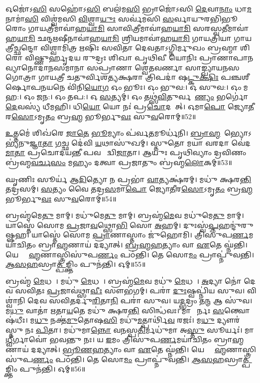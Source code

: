 𑌓𑌜𑍋॑𑌽\ul{𑌸𑌿} 𑌸𑌹𑍋॑𑌽\ul{𑌸𑌿} 𑌬𑌲॑𑌮\ul{𑌸𑌿} 𑌭𑍍𑌰𑌾𑌜𑍋॑𑌽𑌸𑌿 \ul{𑌦𑍇}𑌵𑌾\ul{𑌨𑌾𑌂} 𑌧𑌾\ul{𑌮} 𑌨𑌾𑌮𑌾॑\ul{𑌸𑌿} 𑌵𑌿𑌶𑍍𑌵॑𑌮𑌸𑌿 \ul{𑌵𑌿}𑌶𑍍𑌵𑌾\ul{𑌯𑍁𑌃} 𑌸𑌰𑍍𑌵॑𑌮𑌸𑌿 \ul{𑌸}𑌰𑍍𑌵𑌾𑌯𑍁𑌰𑌭𑌿𑌭𑍂𑌰𑍋𑌂 𑌗𑌾𑌯𑌤𑍍𑌰𑍀𑌮𑌾𑌵𑌾॑𑌹\ul{𑌯𑌾}\ul{𑌮𑌿} 𑌸𑌾𑌵𑌿𑌤𑍍𑌰𑍀𑌮𑌾𑌵𑌾॑𑌹\ul{𑌯𑌾}\ul{𑌮𑌿} 𑌸𑌰𑌸𑍍𑌵𑌤𑍀𑌮𑌾𑌵𑌾॑𑌹\-\ul{𑌯𑌾}\ul{𑌮𑌿} 𑌛𑌨𑍍𑌦𑌋𑌷𑍀𑌨𑌾𑌵𑌾॑𑌹\ul{𑌯𑌾}\ul{𑌮𑌿} 𑌶𑍍𑌰𑌿𑌯𑌮𑌾𑌵𑌾॑𑌹\ul{𑌯𑌾}\ul{𑌮𑌿} 𑌗𑌾𑌯𑌤𑍍𑌰𑌿𑌯𑌾 𑌗𑌾𑌯𑌤𑍍𑌰𑍀𑌚𑍍𑌛𑌨𑍍𑌦𑍋 𑌵𑌿𑌶𑍍𑌵𑌾𑌮𑌿𑌤𑍍𑌰 𑌋𑌷𑌿𑌃 𑌸𑌵𑌿𑌤𑌾 𑌦𑍇𑌵𑌤𑌾𑌽𑌗𑍍𑌨𑌿𑌰𑍍𑌮𑍁𑌖𑌂 𑌬𑍍𑌰𑌹𑍍𑌮𑌾 𑌶𑌿𑌰𑍋 𑌵𑌿𑌷𑍍𑌣𑍁𑌰𑍍\mbox{}𑌹𑍃𑌦𑌯 𑌰𑍁𑌦𑍍𑌰𑌃 𑌶𑌿𑌖𑌾 𑌪𑍃𑌥𑌿𑌵𑍀 𑌯𑍋𑌨𑌿𑌃 𑌪𑍍𑌰𑌾𑌣𑌾𑌪𑌾𑌨𑌵𑍍𑌯𑌾𑌨𑍋𑌦𑌾𑌨𑌸𑌮𑌾𑌨𑌾 𑌸𑌪𑍍𑌰𑌾𑌣𑌾 𑌶𑍍𑌵𑍇𑌤𑌵𑌰𑍍𑌣𑌾 𑌸𑌾𑌙𑍍𑌖𑍍𑌯𑌾𑌯𑌨𑌸𑌗𑍋𑌤𑍍𑌰𑌾 𑌗𑌾𑌯𑌤𑍍𑌰𑍀 𑌚𑌤𑍁𑌰𑍍𑌵𑌿𑌶𑌤𑍍𑌯𑌕𑍍𑌷𑌰𑌾 𑌤𑍍𑌰𑌿𑌪𑌦𑌾॑ 𑌷\ul{𑌟𑍍𑌕𑍁}\ul{𑌕𑍍𑌷𑌿𑌃} 𑌪𑌞𑍍𑌚𑌶𑍀𑌰𑍍\mbox{}𑌷𑍋𑌪𑌨𑌯𑌨𑍇 𑌵𑌿॑𑌨𑌿\ul{𑌯𑍋}\ul{𑌗} 𑌓𑌂 𑌭𑍂𑌃। 
𑌓𑌂 𑌭𑍁𑌵:। 
𑌓 𑌸𑍁𑌵:। 
𑌓𑌂 𑌮𑌹:। 
𑌓𑌂 𑌜𑌨:। 
𑌓𑌂 𑌤𑌪:। 
𑌓 \ul{𑌸}𑌤𑍍𑌯𑌮𑍍। 
𑌓𑌂 𑌤𑌥𑍍𑌸॑\ul{𑌵𑌿}𑌤𑍁𑌰𑍍𑌵𑌰𑍇᳚\ul{𑌣𑍍𑌯𑌂} 𑌭𑌰𑍍𑌗𑍋॑ \ul{𑌦𑍇}𑌵𑌸𑍍𑌯॑ 𑌧𑍀𑌮𑌹𑌿। 
𑌧𑌿\ul{𑌯𑍋} 𑌯𑍋 𑌨𑌃॑ 𑌪𑍍𑌰\ul{𑌚𑍋}𑌦𑌯𑌾᳚𑌤𑍍। 
𑌓𑌮𑌾\ul{𑌪𑍋} 𑌜𑍍𑌯𑍋\ul{𑌤𑍀}𑌰\ul{𑌸𑍋}𑌽𑌮𑍃\ul{𑌤𑌂} 𑌬𑍍𑌰\ul{𑌹𑍍𑌮} 𑌭𑍂𑌰𑍍𑌭𑍁\ul{𑌵𑌃} 𑌸𑍁\ul{𑌵}𑌰𑍋𑌮𑍍॥52॥
\anuvakamend

\ul{𑌉}𑌤𑍍𑌤𑌮𑍇॑ 𑌶𑌿𑌖॑𑌰𑍇 \ul{𑌜𑌾}\ul{𑌤𑍇} \ul{𑌭𑍂}𑌮𑍍𑌯𑌾𑌂 𑌪॑𑌰𑍍𑌵\ul{𑌤}𑌮𑍂𑌰𑍍𑌧॑𑌨𑌿। 
\ul{𑌬𑍍𑌰𑌾}\ul{𑌹𑍍𑌮}𑌣𑍇᳚𑌭𑍍𑌯𑍋𑌽𑌭𑍍𑌯॑𑌨𑍁\-\ul{𑌜𑍍𑌞𑌾}\ul{𑌤𑌾} \ul{𑌗}𑌚𑍍𑌛 𑌦𑍇॑𑌵𑌿 \ul{𑌯}𑌥𑌾𑌸𑍁॑𑌖𑌮𑍍। 
𑌸𑍍𑌤𑍁𑌤𑍋 𑌮𑌯𑌾 𑌵𑌰𑌦𑌾 𑌵𑍇॑𑌦\ul{𑌮𑌾}\ul{𑌤𑌾} 𑌪𑍍𑌰𑌚𑍋𑌦𑌯𑌨𑍍𑌤𑍀 𑌪𑌵𑌨𑍇᳚ 𑌦𑍍𑌵𑌿\ul{𑌜𑌾}𑌤𑌾। 
𑌆𑌯𑍁𑌃 𑌪𑍃𑌥𑌿𑌵𑍍𑌯𑌾𑌂 𑌦𑍍𑌰𑌵𑌿𑌣𑌂 𑌬𑍍𑌰॑𑌹𑍍𑌮\ul{𑌵}\ul{𑌰𑍍𑌚}\ul{𑌸𑌂} 𑌮𑌹𑍍𑌯𑌂 𑌦𑌤𑍍𑌵𑌾 𑌪𑍍𑌰𑌜𑌾𑌤𑍁𑌂 𑌬𑍍𑌰॑𑌹𑍍𑌮\ul{𑌲𑍋}𑌕𑌮𑍍॥53॥
\anuvakamend

𑌘𑍃𑌣𑌿𑌃 𑌸𑍂𑌰𑍍𑌯॑ 𑌆\ul{𑌦𑌿}𑌤𑍍𑌯𑍋 𑌨 𑌪𑍍𑌰𑌭𑌾॑ \ul{𑌵𑌾}𑌤𑍍𑌯𑌕𑍍𑌷॑𑌰𑌮𑍍। 
𑌮𑌧𑍁॑ 𑌕𑍍𑌷𑌰\ul{𑌨𑍍𑌤𑌿} 𑌤𑌦𑍍𑌰॑𑌸𑌮𑍍। 
\ul{𑌸}𑌤𑍍𑌯𑌂 𑌵𑍈 𑌤𑌦𑍍𑌰\ul{𑌸}𑌮𑌾\ul{𑌪𑍋} 𑌜𑍍𑌯𑍋\ul{𑌤𑍀}𑌰\ul{𑌸𑍋}𑌽𑌮𑍃\ul{𑌤𑌂} 𑌬𑍍𑌰\ul{𑌹𑍍𑌮} 𑌭𑍂𑌰𑍍𑌭𑍁\ul{𑌵𑌃} 𑌸𑍁\ul{𑌵}𑌰𑍋𑌮𑍍॥54॥\anuvakamend

𑌬𑍍𑌰𑌹𑍍𑌮॑𑌮𑍇\ul{𑌤𑍁} 𑌮𑌾𑌮𑍍। 
𑌮𑌧𑍁॑𑌮𑍇\ul{𑌤𑍁} 𑌮𑌾𑌮𑍍। 
𑌬𑍍𑌰𑌹𑍍𑌮॑\ul{𑌮𑍇}𑌵 𑌮𑌧𑍁॑𑌮𑍇\ul{𑌤𑍁} 𑌮𑌾𑌮𑍍। 
𑌯𑌾𑌸𑍍𑌤𑍇॑ 𑌸𑍋𑌮 \ul{𑌪𑍍𑌰}𑌜𑌾\ul{𑌵}𑌥𑍍𑌸𑍋\ul{𑌭𑌿} 𑌸𑍋 \ul{𑌅}𑌹𑌮𑍍। 
𑌦𑍁𑌃𑌸𑍍𑌵॑\ul{𑌪𑍍𑌨}𑌹𑌨𑍍𑌦𑍁॑𑌰𑍁𑌷𑍍𑌷𑌹। 
𑌯𑌾𑌸𑍍𑌤𑍇॑ 𑌸𑍋𑌮 \ul{𑌪𑍍𑌰𑌾}𑌣𑌾𑌸𑍍𑌤𑌾𑌂 𑌜𑍁॑𑌹𑍋𑌮𑌿। 
𑌤𑍍𑌰𑌿𑌸𑍁॑𑌪\ul{𑌰𑍍𑌣}𑌮𑌯𑌾॑𑌚𑌿𑌤𑌂 𑌬𑍍𑌰𑌾\ul{𑌹𑍍𑌮}𑌣𑌾𑌯॑ 𑌦𑌦𑍍𑌯𑌾𑌤𑍍। 
\ul{𑌬𑍍𑌰}\ul{𑌹𑍍𑌮}\ul{𑌹}𑌤𑍍𑌯𑌾𑌂 𑌵𑌾 \ul{𑌏}𑌤𑍇 𑌘𑍍𑌨॑𑌨𑍍𑌤𑌿। 
𑌯𑍇 𑌬𑍍𑌰𑌾᳚\ul{𑌹𑍍𑌮}𑌣𑌾𑌸𑍍𑌤𑍍𑌰𑌿𑌸𑍁॑𑌪\ul{𑌰𑍍𑌣𑌂} 𑌪𑌠॑𑌨𑍍𑌤𑌿। 
𑌤𑍇 𑌸𑍋\ul{𑌮𑌂} 𑌪𑍍𑌰𑌾𑌪𑍍𑌨𑍁॑𑌵𑌨𑍍𑌤𑌿। 
\ul{𑌆}\ul{𑌸}\ul{𑌹}𑌸𑍍𑌰𑌾\ul{𑌤𑍍𑌪}𑌙𑍍𑌕𑍍𑌤𑌿𑌂 𑌪𑍁𑌨॑𑌨𑍍𑌤𑌿। 
𑌓𑌮𑍍॥55॥
\anuvakamend

𑌬𑍍𑌰𑌹𑍍𑌮॑ \ul{𑌮𑍇}𑌧𑌯𑌾᳚। 
𑌮𑌧𑍁॑ \ul{𑌮𑍇}𑌧𑌯𑌾᳚। 
𑌬𑍍𑌰𑌹𑍍𑌮॑\ul{𑌮𑍇}𑌵 𑌮𑌧𑍁॑ \ul{𑌮𑍇}𑌧𑌯𑌾᳚। 
\ul{𑌅}𑌦𑍍𑌯𑌾 𑌨𑍋॑ 𑌦𑍇𑌵 𑌸𑌵𑌿𑌤𑌃 \ul{𑌪𑍍𑌰}𑌜𑌾𑌵॑𑌥𑍍𑌸𑌾\ul{𑌵𑍀𑌃} 𑌸𑍗𑌭॑𑌗𑌮𑍍। 
𑌪𑌰𑌾॑ \ul{𑌦𑍁𑌃}𑌷𑍍𑌵𑌪𑍍𑌨𑌿॑𑌯 𑌸𑍁𑌵। 
𑌵𑌿𑌶𑍍𑌵𑌾॑𑌨𑌿 𑌦𑍇𑌵 𑌸𑌵𑌿𑌤𑌰𑍍𑌦𑍁\ul{𑌰𑌿}𑌤𑌾\ul{𑌨𑌿} 𑌪𑌰𑌾॑ 𑌸𑍁𑌵। 
𑌯\ul{𑌦𑍍𑌭}𑌦𑍍𑌰𑌂 𑌤\ul{𑌨𑍍𑌮} 𑌆 𑌸𑍁॑𑌵। 
𑌮\ul{𑌧𑍁} 𑌵𑌾𑌤𑌾॑ 𑌋𑌤𑌾\ul{𑌯}𑌤𑍇 𑌮𑌧𑍁॑ 𑌕𑍍𑌷𑌰\ul{𑌨𑍍𑌤𑌿} 𑌸𑌿𑌨𑍍𑌧॑𑌵𑌃। 
𑌮𑌾𑌧𑍍𑌵𑍀᳚𑌰𑍍𑌨𑌃 \ul{𑌸}𑌨𑍍𑌤𑍍𑌵𑍋𑌷॑𑌧𑍀𑌃। 
𑌮\ul{𑌧𑍁} 𑌨𑌕𑍍𑌤॑\ul{𑌮𑍁}𑌤𑍋𑌷\ul{𑌸𑌿} 𑌮𑌧𑍁॑\ul{𑌮}𑌤𑍍𑌪𑌾𑌰𑍍𑌥𑌿॑\ul{𑌵}\ul{} 𑌰𑌜𑌃॑। 
𑌮\ul{𑌧𑍁} 𑌦𑍍𑌯𑍗𑌰॑𑌸𑍍𑌤𑍁 𑌨𑌃 \ul{𑌪𑌿}𑌤𑌾। 
𑌮𑌧𑍁॑𑌮𑌾\ul{𑌨𑍍𑌨𑍋} 𑌵\ul{𑌨}𑌸𑍍𑌪\ul{𑌤𑌿}𑌰𑍍𑌮𑌧𑍁॑𑌮𑌾 𑌅\ul{𑌸𑍍𑌤𑍁} 𑌸𑍂𑌰𑍍𑌯𑌃॑। 
𑌮𑌾\ul{𑌧𑍍𑌵𑍀}𑌰𑍍𑌗𑌾𑌵𑍋॑ 𑌭𑌵𑌨𑍍𑌤𑍁 𑌨𑌃। 
𑌯 \ul{𑌇}𑌮𑌂 𑌤𑍍𑌰𑌿𑌸𑍁॑𑌪\ul{𑌰𑍍𑌣}𑌮𑌯𑌾॑𑌚𑌿𑌤𑌂 𑌬𑍍𑌰𑌾\ul{𑌹𑍍𑌮}𑌣𑌾𑌯॑ 𑌦𑌦𑍍𑌯𑌾𑌤𑍍। 
\ul{𑌭𑍍𑌰𑍂}\ul{𑌣}\ul{𑌹}𑌤𑍍𑌯𑌾𑌂 𑌵𑌾 \ul{𑌏}𑌤𑍇 𑌘𑍍𑌨॑𑌨𑍍𑌤𑌿। 
𑌯𑍇 𑌬𑍍𑌰𑌾᳚\ul{𑌹𑍍𑌮}𑌣𑌾𑌸𑍍𑌤𑍍𑌰𑌿𑌸𑍁॑𑌪\ul{𑌰𑍍𑌣𑌂} 𑌪𑌠॑𑌨𑍍𑌤𑌿। 
𑌤𑍇 𑌸𑍋\ul{𑌮𑌂} 𑌪𑍍𑌰𑌾𑌪𑍍𑌨𑍁॑𑌵𑌨𑍍𑌤𑌿। 
\ul{𑌆}\ul{𑌸}\ul{𑌹}𑌸𑍍𑌰𑌾\ul{𑌤𑍍𑌪}𑌙𑍍𑌕𑍍𑌤𑌿𑌂 𑌪𑍁𑌨॑𑌨𑍍𑌤𑌿। 
𑌓𑌮𑍍॥56॥
\anuvakamend


